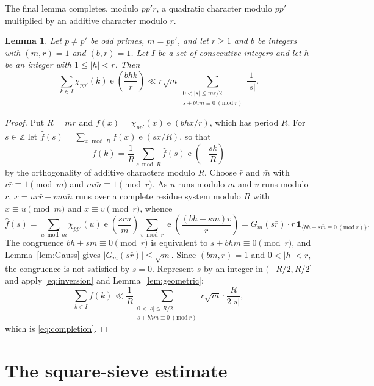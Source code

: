 \documentclass[11pt]{amsart}
\numberwithin{equation}{section}
\numberwithin{figure}{section}
\newtheorem{lemma}{Lemma}[section]
\theoremstyle{definition}
\newcommand{\Z}{\mathbb{Z}}
\newcommand{\e}{\operatorname{e}}
\begin{document}
The final lemma completes, modulo $pp'r$, a quadratic character modulo
$pp'$ multiplied by an additive character modulo $r$.

\begin{lemma}\label{lem:completion}
Let $p\ne p'$ be odd primes, $m=pp'$, and let $r\ge1$ and $b$ be integers
with $(m,r)=1$ and $(b,r)=1$.  Let $I$ be a set of consecutive integers and
let $h$ be an integer with $1\le|h|<r$.  Then
\begin{equation}\label{eq:completion}
  \sum_{k\in I}\chi_{pp'}(k)\e\left(\frac{bhk}r\right)
  \ll r\sqrt m\sum_{\substack{0<|s|\le mr/2\\ s+bhm\equiv0\ (\mathrm{mod}\ r)}}
  \frac1{|s|}.
\end{equation}
\end{lemma}

\begin{proof}
Put $R=mr$ and $f(x)=\chi_{pp'}(x)\e(bhx/r)$, which has period $R$.  For
$s\in\Z$ let $\widehat f(s)=\sum_{x\bmod R}f(x)\e(sx/R)$, so that
\begin{equation}\label{eq:inversion}
  f(k)=\frac1R\sum_{s\bmod R}\widehat f(s)\e\left(-\frac{sk}R\right)
\end{equation}
by the orthogonality of additive characters modulo $R$.  Choose $\bar r$
and $\bar m$ with $r\bar r\equiv1\pmod m$ and $m\bar m\equiv1\pmod r$.
As $u$ runs modulo $m$ and $v$ runs modulo $r$, $x=ur\bar r+vm\bar m$ runs
over a complete residue system modulo $R$ with $x\equiv u\pmod m$ and
$x\equiv v\pmod r$, whence
\[
  \widehat f(s)
  =\sum_{u\bmod m}\chi_{pp'}(u)\e\left(\frac{s\bar ru}m\right)
   \sum_{v\bmod r}\e\left(\frac{(bh+s\bar m)v}r\right)
  =G_m(s\bar r)\cdot r\,\mathbf1_{\{bh+s\bar m\equiv0\ (\mathrm{mod}\ r)\}}.
\]
The congruence $bh+s\bar m\equiv0\pmod r$ is equivalent to
$s+bhm\equiv0\pmod r$, and Lemma~\ref{lem:Gauss} gives
$|G_m(s\bar r)|\le\sqrt m$.  Since $(bm,r)=1$ and $0<|h|<r$, the
congruence is not satisfied by $s=0$.  Represent $s$ by an integer in
$(-R/2,R/2]$ and apply \eqref{eq:inversion} and Lemma~\ref{lem:geometric}:
\[
  \sum_{k\in I}f(k)
  \ll\frac1R\sum_{\substack{0<|s|\le R/2\\ s+bhm\equiv0\ (\mathrm{mod}\ r)}}
  r\sqrt m\cdot\frac R{2|s|},
\]
which is \eqref{eq:completion}.
\end{proof}


\section{The square-sieve estimate}\label{sec:sieve}
\end{document}
